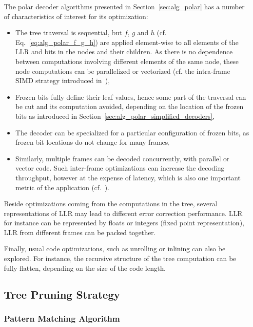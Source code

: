 The polar decoder algorithms presented in Section~\ref{sec:alg_polar} has a
number of characteristics of interest for its optimization:
\begin{itemize}
  \item The tree traversal is sequential, but $f$, $g$ and $h$ (cf.
    Eq.~\ref{eq:alg_polar_f_g_h}) are applied element-wise to all elements of
    the LLR and bits in the nodes and their children. As there is no dependence
    between computations involving different elements of the same node, these
    node computations can be parallelized or vectorized (cf. the
    intra-frame SIMD strategy introduced in~\cite{Giard2014}),
  \item Frozen bits fully define their leaf values, hence some part of the
    traversal can be cut and its computation avoided, depending on the
    location of the frozen bits as introduced in
    Section~\ref{sec:alg_polar_simplified_decoders},
  \item The decoder can be specialized for a particular configuration of frozen
    bits, as frozen bit locations do not change for many frames,
  \item Similarly, multiple frames can be decoded concurrently, with parallel or
    vector code. Such inter-frame optimizations can increase the decoding
    throughput, however at the expense of latency, which is also one important
    metric of the application (cf.~\cite{LeGal2015a}).
\end{itemize}

Beside optimizations coming from the computations in the tree, several
representations of LLR may lead to different error correction performance. LLR
for instance can be represented by floats or integers (fixed point
representation), LLR from different frames can be packed together.

Finally, usual code optimizations, such as unrolling or inlining can also be
explored. For instance, the recursive structure of the tree computation can be
fully flatten, depending on the size of the code length.

\subsection{Tree Pruning Strategy}
\label{sec:opt_polar_tree_pruning}

\subsubsection{Pattern Matching Algorithm}
\label{sec:opt_polar_pattern_matching}

